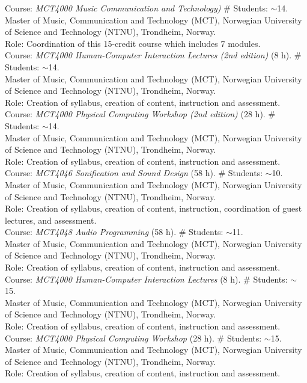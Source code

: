 \documentclass[10pt, a4paper]{article}
\newcommand{\years}[1]{\marginnote{\scriptsize #1}}
\begin{document}
\years{10/2019}Course: \emph{MCT4000 Music Communication and Technology)} \# Students: $\sim$14. \\
Master of Music, Communication and Technology (MCT), Norwegian University of Science and Technology (NTNU), Trondheim, Norway.\\ 
Role: Coordination of this 15-credit course which includes 7 modules.\\
\years{10/2019}Course: \emph{MCT4000 Human-Computer Interaction Lectures (2nd edition)} (8 h). \# Students: $\sim$14. \\
Master of Music, Communication and Technology (MCT), Norwegian University of Science and Technology (NTNU), Trondheim, Norway.\\ 
Role: Creation of syllabus, creation of content, instruction and assessment.\\
\years{10/2019}Course: \emph{MCT4000 Physical Computing Workshop (2nd edition)} (28 h). \# Students: $\sim$14. \\
Master of Music, Communication and Technology (MCT), Norwegian University of Science and Technology (NTNU), Trondheim, Norway.\\ 
Role: Creation of syllabus, creation of content, instruction and assessment.\\
\years{1/2019}Course: \emph{MCT4046 Sonification and Sound Design} (58 h). \# Students: $\sim$10. \\
Master of Music, Communication and Technology (MCT), Norwegian University of Science and Technology (NTNU), Trondheim, Norway.\\ 
Role: Creation of syllabus, creation of content, instruction, coordination of guest lectures, and assessment.\\
\years{1/2019}Course: \emph{MCT4048 Audio Programming} (58 h). \# Students: $\sim$11. \\
Master of Music, Communication and Technology (MCT), Norwegian University of Science and Technology (NTNU), Trondheim, Norway.\\ 
Role: Creation of syllabus, creation of content, instruction and assessment.\\
\years{10/2018}Course: \emph{MCT4000 Human-Computer Interaction Lectures} (8 h). \# Students: $\sim$15. \\
Master of Music, Communication and Technology (MCT), Norwegian University of Science and Technology (NTNU), Trondheim, Norway.\\ 
Role: Creation of syllabus, creation of content, instruction and assessment.\\
\years{10/2018}Course: \emph{MCT4000 Physical Computing Workshop} (28 h). \# Students: $\sim$15. \\
Master of Music, Communication and Technology (MCT), Norwegian University of Science and Technology (NTNU), Trondheim, Norway.\\ 
Role: Creation of syllabus, creation of content, instruction and assessment.
\end{document}
